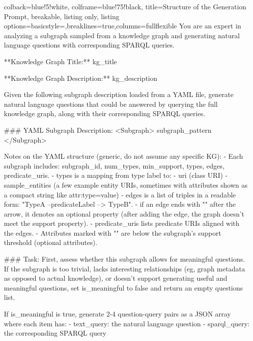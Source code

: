 \begin{tcblisting}{
  colback=blue!5!white,
  colframe=blue!75!black,
  title=Structure of the Generation Prompt,
  breakable,
  listing only,
  listing options={basicstyle=\ttfamily\scriptsize,breaklines=true,columns=fullflexible}
}
You are an expert in analyzing a subgraph sampled from a knowledge graph and generating natural language questions with corresponding SPARQL
queries.


{%
**Knowledge Graph Title:** {{ kg_title }}
{%
{%
**Knowledge Graph Description:** {{ kg_description }}
{%

Given the following subgraph description loaded from a YAML file, generate
natural language questions that could be answered by querying the full knowledge graph, along with their corresponding
SPARQL queries.

### YAML Subgraph Description:
<Subgraph>
    {{ subgraph_pattern }}
</Subgraph>

Notes on the YAML structure (generic, do not assume any specific KG):
- Each subgraph includes: subgraph_id, num_types, min_support, types, edges, predicate_uris.
- types is a mapping from type label to:
- uri (class URI)
- sample_entities (a few example entity URIs, sometimes with attributes shown as a compact string like attr:type=value)
- edges is a list of triples in a readable form: "TypeA --predicateLabel --> TypeB".
- if an edge ends with "\*" after the arrow, it denotes an optional property (after adding the edge, the graph doesn't
meet the support property).
- predicate_uris lists predicate URIs aligned with the edges.
- Attributes marked with "\*" are below the subgraph's support threshold (optional attributes).

### Task:
First, assess whether this subgraph allows for meaningful questions. If the subgraph is too trivial, lacks interesting
relationships (eg, graph metadata as opposed to actual knowledge), or doesn't support generating useful and meaningful questions, set is_meaningful to false and return an empty questions
list.

If is_meaningful is true, generate 2-4 question-query pairs as a JSON array where each item has:
- text_query: the natural language question
- sparql_query: the corresponding SPARQL query



}}}}
\end{tcblisting}
